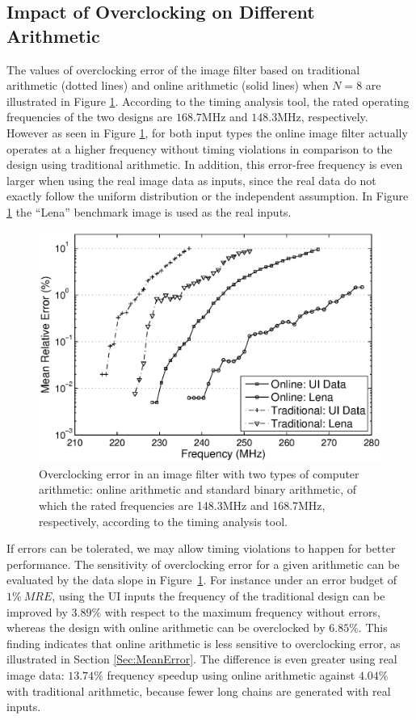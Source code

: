 \documentclass{acm_proc_article-sp}
\begin{document}
\subsection{Impact of Overclocking on Different\\ Arithmetic}
The values of overclocking error of the image filter based on traditional arithmetic (dotted lines) and online arithmetic (solid lines) when $N=8$ are illustrated in Figure \ref{Fig:MRE_ImageFilter}. According to the timing analysis tool, the rated operating frequencies of the two designs are $168.7$MHz and $148.3$MHz, respectively. However as seen in Figure \ref{Fig:MRE_ImageFilter}, for both input types the online image filter actually operates at a higher frequency without timing violations in comparison to the design using traditional arithmetic. In addition, this error-free frequency is even larger when using the real image data as inputs, since the real data do not exactly follow the uniform distribution or the independent assumption. In Figure \ref{Fig:MRE_ImageFilter} the ``Lena'' benchmark image is used as the real inputs.
%
\begin{figure}
    \centering
    \includegraphics[width=.5\textwidth]{./Figures/MRE.eps}
    \caption{Overclocking error in an image filter with two types of computer arithmetic: online arithmetic and standard binary arithmetic, of which the rated frequencies are 148.3MHz and 168.7MHz, respectively, according to the timing analysis tool.}
\label{Fig:MRE_ImageFilter}
\vspace{-2ex}
\end{figure}

\vspace{-1ex}
If errors can be tolerated, we may allow timing violations to happen for better performance. The sensitivity of overclocking error for a given arithmetic can be evaluated by the data slope in Figure~\ref{Fig:MRE_ImageFilter}. For instance under an error budget of $1\%~MRE$, using the UI inputs the frequency of the traditional design can be improved by $3.89\%$ with respect to the maximum frequency without errors, whereas the design with online arithmetic can be overclocked by $6.85\%$. This finding indicates that online arithmetic is less sensitive to overclocking error, as illustrated in Section \ref{Sec:MeanError}. The difference is even greater using real image data: $13.74\%$ frequency speedup using online arithmetic against $4.04\%$ with traditional arithmetic, because fewer long chains are generated with real inputs.\vspace{-1ex}
\end{document}
